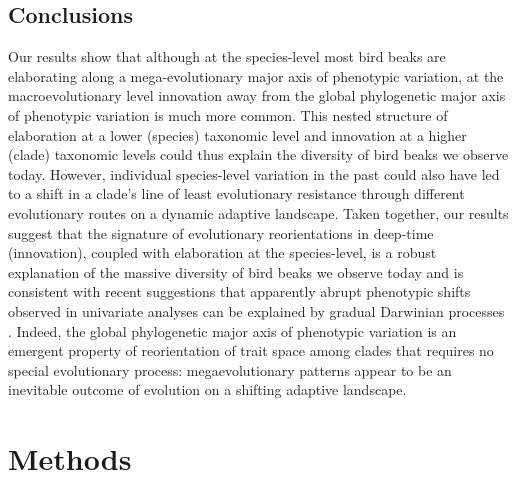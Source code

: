 \documentclass[12pt,letterpaper]{article}
\begin{document}
\subsection{Conclusions}

Our results show that although at the species-level most bird beaks are elaborating along a mega-evolutionary major axis of phenotypic variation, at the macroevolutionary level innovation away from the global phylogenetic major axis of phenotypic variation is much more common. 
This nested structure of elaboration at a lower (species) taxonomic level and innovation at a higher (clade) taxonomic levels could thus explain the diversity of bird beaks we observe today.
However, individual species-level variation in the past could also have led to a shift in a clade's line of least evolutionary resistance through different evolutionary routes on a dynamic adaptive landscape. 
Taken together, our results suggest that the signature of evolutionary reorientations in deep-time (innovation), coupled with elaboration at the species-level, is a robust explanation of the massive diversity of bird beaks we observe today and is consistent with recent suggestions that apparently abrupt phenotypic shifts observed in univariate analyses can be explained by gradual Darwinian processes \cite{pagel2022general}.
Indeed, the global phylogenetic major axis of phenotypic variation is an emergent property of reorientation of trait space among clades that requires no special evolutionary process: megaevolutionary patterns appear to be an inevitable outcome of evolution on a shifting adaptive landscape. 



\section{Methods}
\end{document}
